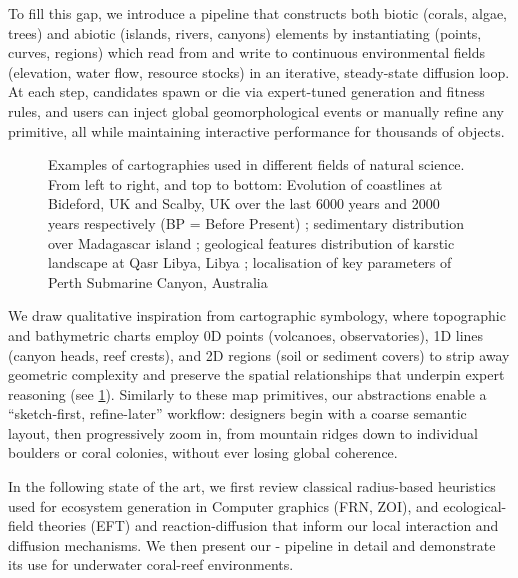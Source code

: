 To fill this gap, we introduce a pipeline that constructs both biotic (corals, algae, trees) and abiotic (islands, rivers, canyons) elements by instantiating  (points, curves, regions) which read from and write to continuous environmental fields (elevation, water flow, resource stocks) in an iterative, steady-state diffusion loop. At each step,  candidates spawn or die via expert-tuned generation and fitness rules, and users can inject global geomorphological events or manually refine any primitive, all while maintaining interactive performance for thousands of objects.


\begin{figure}
    \caption{Examples of cartographies used in different fields of natural science. From left to right, and top to bottom: Evolution of coastlines at Bideford, UK and Scalby, UK over the last 6000 years and 2000 years respectively (BP = Before Present) \cite{Shadrick2022}; sedimentary distribution over Madagascar island \cite{Pratt2017}; geological features distribution of karstic landscape at Qasr Libya, Libya \cite{ElAmawy2009}; localisation of key parameters of Perth Submarine Canyon, Australia \cite{Huang2014}}
    \label{fig:env-obj-symbolics-on-maps}
\end{figure}

We draw qualitative inspiration from cartographic symbology, where topographic and bathymetric charts employ 0D points (volcanoes, observatories), 1D lines (canyon heads, reef crests), and 2D regions (soil or sediment covers) to strip away geometric complexity and preserve the spatial relationships that underpin expert reasoning (see \cref{fig:env-obj-symbolics-on-maps}). Similarly to these map primitives, our  abstractions enable a “sketch-first, refine-later” workflow: designers begin with a coarse semantic layout, then progressively zoom in, from mountain ridges down to individual boulders or coral colonies, without ever losing global coherence.

In the following state of the art, we first review classical radius-based heuristics used for ecosystem generation in Computer graphics (FRN, ZOI), and ecological-field theories (EFT) and reaction-diffusion that inform our local interaction and diffusion mechanisms. We then present our - pipeline in detail and demonstrate its use for underwater coral-reef environments. %


